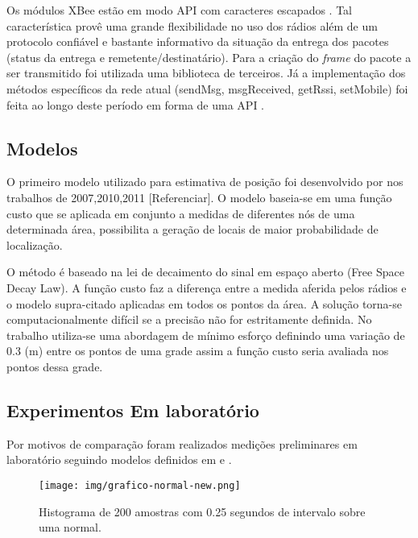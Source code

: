 Os módulos XBee estão em modo API com caracteres escapados \cite{Digi2011}. Tal característica provê uma grande flexibilidade no uso dos rádios além de um protocolo confiável e bastante informativo da situação da entrega dos pacotes (status da entrega e remetente/destinatário). Para a criação do \textit{frame} do pacote a ser transmitido foi utilizada uma biblioteca de terceiros. Já a implementação dos métodos específicos da rede atual (sendMsg, msgReceived, getRssi, setMobile) foi feita ao longo deste período em forma de uma API \cite{Faludi2010}.



\subsection*{Modelos}

O primeiro modelo utilizado para estimativa de posição foi desenvolvido por \cite{Lopez2011} nos trabalhos de 2007,2010,2011 [Referenciar]. O modelo baseia-se em uma função custo que se aplicada em conjunto a medidas de diferentes nós de uma determinada área, possibilita a geração de locais de maior probabilidade de localização.

O método é baseado na lei de decaimento do sinal em espaço aberto (Free Space Decay Law). A função custo faz a diferença entre a medida aferida pelos rádios e o modelo supra-citado aplicadas em todos os pontos da área. A solução torna-se computacionalmente difícil se a precisão não for estritamente definida. No trabalho \cite{Lopez2011} utiliza-se uma abordagem de mínimo esforço definindo uma variação de 0.3 (m) entre os pontos de uma grade assim a função custo seria avaliada nos pontos dessa grade.

\subsection*{Experimentos Em laboratório}

Por motivos de comparação foram realizados medições preliminares em laboratório seguindo modelos definidos em \cite{Lopez2011} e \cite{Kaemarungsi2004}.
\begin{figure}[ht]
\centering
\texttt{[image: img/grafico-normal-new.png]}
\caption{Histograma de 200 amostras com 0.25 segundos de intervalo sobre uma normal. \label{fig:normal}}
\end{figure}

